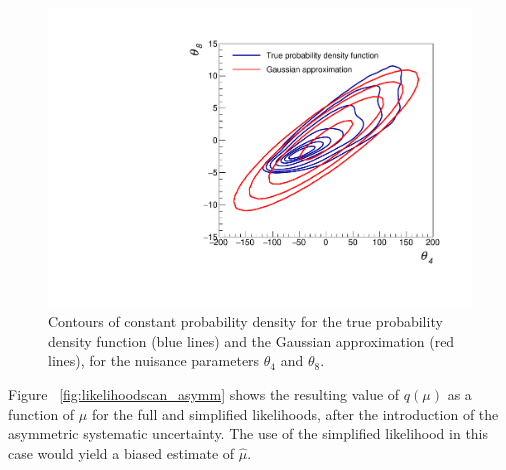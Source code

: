 \begin{figure}[hbt]
  \begin{center} 
   \includegraphics[width=1.5\cmsFigWidth]{figures/compare_pdf.pdf}
   \caption{Contours of constant probability density for the true probability density 
   function (blue lines) and the Gaussian approximation (red lines), 
   for the nuisance parameters $\theta_{4}$ and $\theta_{8}$.}
   \label{fig:asymmgauss} 
  \end{center}
\end{figure}

Figure ~\ref{fig:likelihoodscan_asymm} shows the resulting 
value of $q(\mu)$ as a function of $\mu$ for the full and simplified likelihoods, after the introduction of the asymmetric systematic uncertainty.  
The use of the simplified likelihood in this case would yield a biased estimate of $\hat{\mu}$.  


